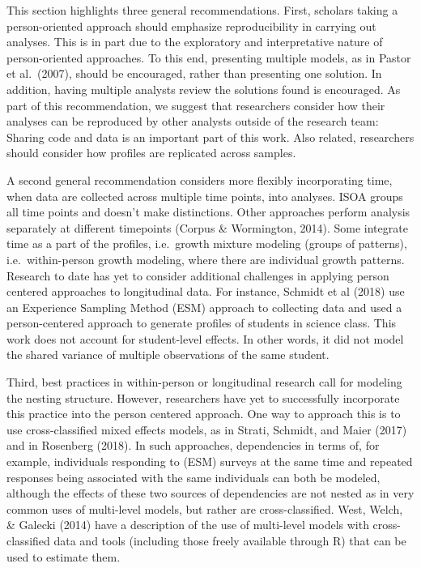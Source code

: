 \documentclass[
  english,
  man]{apa6}
\begin{document}
This section highlights three general recommendations. First, scholars taking a
person-oriented approach should emphasize reproducibility in carrying out
analyses. This is in part due to the exploratory and interpretative nature of
person-oriented approaches. To this end, presenting multiple models, as in
Pastor et al.~(2007), should be encouraged, rather than presenting one solution.
In addition, having multiple analysts review the solutions found is encouraged.
As part of this recommendation, we suggest that researchers consider how their
analyses can be reproduced by other analysts outside of the research team:
Sharing code and data is an important part of this work. Also related,
researchers should consider how profiles are replicated across samples.

A second general recommendation considers more flexibly incorporating time, when
data are collected across multiple time points, into analyses. ISOA groups all
time points and doesn't make distinctions. Other approaches perform analysis
separately at different timepoints (Corpus \& Wormington, 2014). Some integrate
time as a part of the profiles, i.e.~growth mixture modeling (groups of
patterns), i.e.~within-person growth modeling, where there are individual growth
patterns. Research to date has yet to consider additional challenges in applying
person centered approaches to longitudinal data. For instance, Schmidt et al
(2018) use an Experience Sampling Method (ESM) approach to collecting data and
used a person-centered approach to generate profiles of students in science
class. This work does not account for student-level effects. In other words, it
did not model the shared variance of multiple observations of the same student.

Third, best practices in within-person or longitudinal research call for
modeling the nesting structure. However, researchers have yet to successfully
incorporate this practice into the person centered approach. One way to approach
this is to use cross-classified mixed effects models, as in Strati, Schmidt, and
Maier (2017) and in Rosenberg (2018). In such approaches, dependencies in terms
of, for example, individuals responding to (ESM) surveys at the same time and
repeated responses being associated with the same individuals can both be
modeled, although the effects of these two sources of dependencies are not
nested as in very common uses of multi-level models, but rather are
cross-classified. West, Welch, \& Galecki (2014) have a description of the use of
multi-level models with cross-classified data and tools (including those freely
available through R) that can be used to estimate them.
\end{document}
